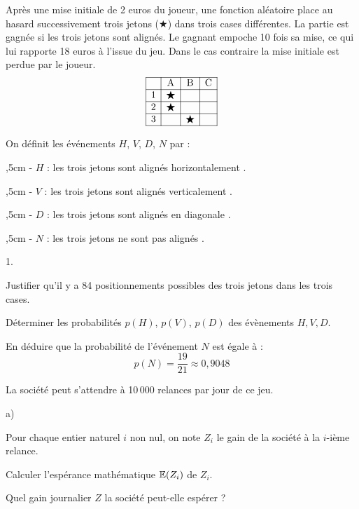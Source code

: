 \documentclass[11pt]{article}%
\begin{document}
{\begin{minipage}{.965\textwidth}
\vpp
\noindent Après une mise initiale de 2 euros du joueur, une fonction
aléatoire place au hasard successivement trois jetons ($\bigstar$) dans
trois cases différentes.
La partie est gagnée si les trois jetons sont alignés. Le gagnant
empoche 10 fois sa mise, ce qui lui rapporte 18 euros à l'issue du jeu.
Dans le cas
contraire la mise initiale est perdue par le joueur.
\[
\begin{array}{|c|c|c|c|}
 \hline & \textrm{A} & \textrm{B} & \textrm{C} \\
\hline 1 & \bigstar & & \\
\hline 2 & \bigstar & &\\
\hline 3 & &\bigstar & \\
\hline
\end{array}
\]

\vpp
On définit les événements $H$, $V$, $D$, $N$ par :

,5cm - $H$ : \og les trois jetons sont alignés horizontalement
\fg.

,5cm - $V$ : \og les trois jetons sont alignés verticalement
\fg.

,5cm - $D$ : \og les trois jetons sont alignés en diagonale
\fg.

,5cm - $N$ : \og les trois jetons ne sont pas alignés \fg.
\end{minipage}

\vpp
\begin{noliste}{1.}
 \setlength{\itemsep}{4mm}
\item Justifier qu'il y a 84 positionnements possibles des trois jetons
dans les trois cases.

\item Déterminer les probabilités $p(H)$, $p(V)$, $p(D)$ des évènements
$H,V,D$.

\item En déduire que la probabilité de l'événement $N$ est égale à :
\[
p(N) = \frac{19}{21}\approx 0,9048
\]

\item La société peut s'attendre à 10\,000 relances par jour de ce jeu.
\begin{noliste}{a)}
 \setlength{\itemsep}{2mm}
\item Pour chaque entier naturel $i$ non nul, on note $Z_{i}$ le gain
de la société à la $i$-ième relance.

\noindent Calculer l'espérance mathématique $\mathbb{E}(Z_{i})$ de $Z_{i}$.

\item Quel gain journalier $Z$ la société peut-elle espérer ? 
\end{noliste} 
\end{noliste} 


}
\end{document}
